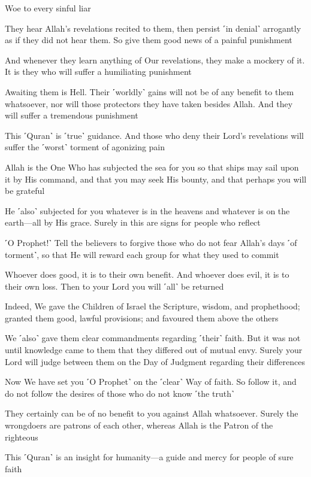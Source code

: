 Woe to every sinful liar

They hear Allah’s revelations recited to them, then persist ˹in denial˺ arrogantly as if they did not hear them. So give them good news of a painful punishment

And whenever they learn anything of Our revelations, they make a mockery of it. It is they who will suffer a humiliating punishment

Awaiting them is Hell. Their ˹worldly˺ gains will not be of any benefit to them whatsoever, nor will those protectors they have taken besides Allah. And they will suffer a tremendous punishment

This ˹Quran˺ is ˹true˺ guidance. And those who deny their Lord’s revelations will suffer the ˹worst˺ torment of agonizing pain

Allah is the One Who has subjected the sea for you so that ships may sail upon it by His command, and that you may seek His bounty, and that perhaps you will be grateful

He ˹also˺ subjected for you whatever is in the heavens and whatever is on the earth—all by His grace. Surely in this are signs for people who reflect

˹O Prophet!˺ Tell the believers to forgive those who do not fear Allah’s days ˹of torment˺, so that He will reward each group for what they used to commit

Whoever does good, it is to their own benefit. And whoever does evil, it is to their own loss. Then to your Lord you will ˹all˺ be returned

Indeed, We gave the Children of Israel the Scripture, wisdom, and prophethood; granted them good, lawful provisions; and favoured them above the others

We ˹also˺ gave them clear commandments regarding ˹their˺ faith. But it was not until knowledge came to them that they differed out of mutual envy. Surely your Lord will judge between them on the Day of Judgment regarding their differences

Now We have set you ˹O Prophet˺ on the ˹clear˺ Way of faith. So follow it, and do not follow the desires of those who do not know ˹the truth˺

They certainly can be of no benefit to you against Allah whatsoever. Surely the wrongdoers are patrons of each other, whereas Allah is the Patron of the righteous

This ˹Quran˺ is an insight for humanity—a guide and mercy for people of sure faith

